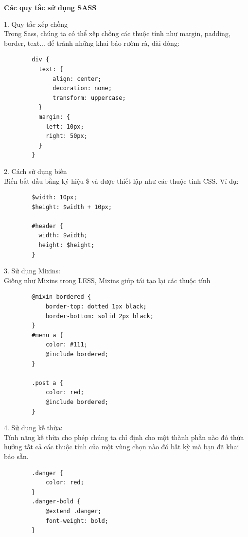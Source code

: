 \textbf{Các quy tắc sử dụng SASS}
\begin{description}
    \item 1. Quy tắc xếp chồng\\
    Trong Sass, chúng ta có thể xếp chồng các thuộc tính như margin, padding, border, text... để tránh những khai báo rườm rà, dài dòng:
    \begin{verbatim}
        div {
          text: {
              align: center;
              decoration: none;
              transform: uppercase;
          }
          margin: {
            left: 10px;
            right: 50px;
          }
        }
    \end{verbatim}
    \item 2. Cách sử dụng biến\\
    Biến bắt đầu bằng ký hiệu \$ và được thiết lập như các thuộc tính CSS. Ví dụ:
    \begin{verbatim}
        $width: 10px;
        $height: $width + 10px;

        #header {
          width: $width;
          height: $height;
        }
    \end{verbatim}
    \item 3. Sử dụng Mixins:\\
    Giống như Mixins trong LESS, Mixins giúp tái tạo lại các thuộc tính
    \begin{verbatim}
        @mixin bordered {
            border-top: dotted 1px black;
            border-bottom: solid 2px black;
        }
        #menu a {
            color: #111;
            @include bordered;
        }
        
        .post a {
            color: red;
            @include bordered;
        }
    \end{verbatim}
    \item 4. Sử dụng kế thừa:\\
    Tính năng kế thừa cho phép chúng ta chỉ định cho một thành phần nào đó thừa hưởng tất cả các thuộc tính của một vùng chọn nào đó bất kỳ mà bạn đã khai báo sẵn.
    \begin{verbatim}
        .danger {
            color: red;
        }
        .danger-bold {
            @extend .danger;
            font-weight: bold;
        }
    \end{verbatim}
\end{description}
